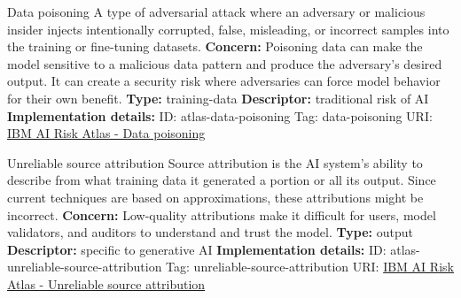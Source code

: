 \documentclass[a4paper,12pt]{article}
\begin{document}
\begin{definitionbox}{Data poisoning}
A type of adversarial attack where an adversary or malicious insider injects intentionally corrupted, false, misleading, or incorrect samples into the training or fine-tuning datasets.\newline\newline
\textbf{Concern: }Poisoning data can make the model sensitive to a malicious data pattern and produce the adversary's desired output. It can create a security risk where adversaries can force model behavior for their own benefit.\newline\newline
\textbf{Type: }training-data\newline
\textbf{Descriptor: }traditional risk of AI \newline\newline
\textbf{Implementation details: } \newline
ID: atlas-data-poisoning \newline
Tag: data-poisoning \newline
URI:  \href{https://www.ibm.com/docs/en/watsonx/saas?topic=SSYOK8/wsj/ai-risk-atlas/data-poisoning.html}{IBM AI Risk Atlas - Data poisoning}\newline
\end{definitionbox}
\begin{definitionbox}{Unreliable source attribution}
Source attribution is the AI system's ability to describe from what training data it generated a portion or all its output. Since current techniques are based on approximations, these attributions might be incorrect.\newline\newline
\textbf{Concern: }Low-quality attributions make it difficult for users, model validators, and auditors to understand and trust the model.\newline\newline
\textbf{Type: }output\newline
\textbf{Descriptor: }specific to generative AI \newline\newline
\textbf{Implementation details: } \newline
ID: atlas-unreliable-source-attribution \newline
Tag: unreliable-source-attribution \newline
URI:  \href{https://www.ibm.com/docs/en/watsonx/saas?topic=SSYOK8/wsj/ai-risk-atlas/unreliable-source-attribution.html}{IBM AI Risk Atlas - Unreliable source attribution}\newline
\end{definitionbox}
\end{document}
